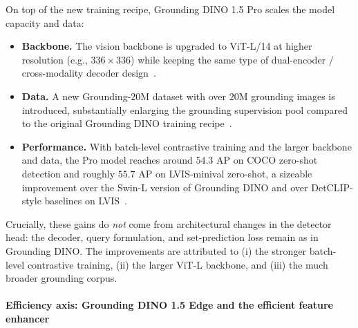 \begin{enrichment}
\begin{enrichment}
		On top of the new training recipe, Grounding DINO 1.5 Pro scales the model capacity and data:
		\begin{itemize}
			\item \textbf{Backbone.} The vision backbone is upgraded to ViT-L/14 at higher resolution (e.g., \(336\times 336\)) while keeping the same type of dual-encoder / cross-modality decoder design~\cite{ren2024_groundingdino15}.
			\item \textbf{Data.} A new Grounding-20M dataset with over 20M grounding images is introduced, substantially enlarging the grounding supervision pool compared to the original Grounding DINO training recipe~\cite{ren2024_groundingdino15,liu2023_groundingdino}.
			\item \textbf{Performance.} With batch-level contrastive training and the larger backbone and data, the Pro model reaches around \(54.3\) AP on COCO zero-shot detection and roughly \(55.7\) AP on LVIS-minival zero-shot, a sizeable improvement over the Swin-L version of Grounding DINO and over DetCLIP-style baselines on LVIS~\cite{ren2024_groundingdino15,yao2023_detclipv2}.
		\end{itemize}
		Crucially, these gains do \emph{not} come from architectural changes in the detector head: the decoder, query formulation, and set-prediction loss remain as in Grounding DINO. The improvements are attributed to (i) the stronger batch-level contrastive training, (ii) the larger ViT-L backbone, and (iii) the much broader grounding corpus.
		
		\newpage
		
		\paragraph{Efficiency axis: Grounding DINO 1.5 Edge and the efficient feature enhancer}
		

\end{enrichment}
\end{enrichment}
